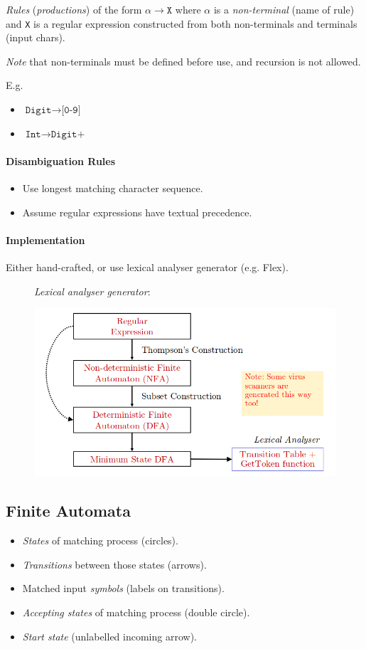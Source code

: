 \documentclass[twocolumn,english]{article}
\begin{document}
\emph{Rules} (\emph{productions}) of the form $\alpha\rightarrow\texttt{X}$
where $\alpha$ is a \emph{non-terminal} (name of rule) and \texttt{X}
is a regular expression constructed from both non-terminals and terminals
(input chars).

\emph{Note} that non-terminals must be defined before use, and recursion
is not allowed.

E.g.
\begin{itemize}
\item $\texttt{Digit}\rightarrow\texttt{[0-9]}$
\item $\texttt{Int}\rightarrow\texttt{Digit+}$
\end{itemize}

\paragraph{Disambiguation Rules}
\begin{itemize}
\item Use longest matching character sequence.
\item Assume regular expressions have textual precedence.
\end{itemize}

\paragraph{Implementation}

Either hand-crafted, or use lexical analyser generator (e.g. Flex).

\begin{figure}[H]
\begin{centering}
\emph{Lexical analyser generator}:
\par\end{centering}
\centering{}\includegraphics[width=0.75\linewidth]{img/lex}
\end{figure}

\subsection{Finite Automata}
\begin{itemize}
\item \emph{States} of matching process (circles).
\item \emph{Transitions} between those states (arrows).
\item Matched input \emph{symbols} (labels on transitions).
\item \emph{Accepting states} of matching process (double circle).
\item \emph{Start state} (unlabelled incoming arrow).
\end{itemize}
\end{document}
